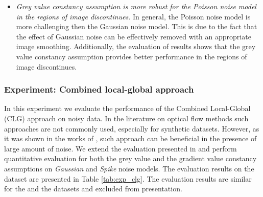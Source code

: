\begin{itemize}
	\item \textit{Grey value constancy assumption is more robust for the Poisson noise model in the regions of image discontinues}.  In general, the Poisson noise model is more challenging then the Gaussian noise model. This is due to the fact that the effect of Gaussian noise can be effectively removed with an appropriate image smoothing. Additionally, the evaluation of results shows that the grey value constancy assumption provides better performance in the regions of image discontinues.  
\end{itemize}





\subsubsection{Experiment: Combined local-global approach}
\label{experimen_combined_local_global_approach}


In this experiment we evaluate the performance of the Combined Local-Global (CLG) approach on noisy data. In the literature on optical flow methods such approaches are not commonly used, especially for synthetic datasets. However, as it was shown in the works of \cite{Bruhn02, Bruhn05a}, such approach can be beneficial in the presence of large amount of noise. We extend the evaluation presented in \cite{BruhnThesis} and perform quantitative evaluation for both the grey value and the gradient value constancy assumptions on \textit{Gaussian} and \textit{Spike} noise models. The evaluation results on the \rub dataset are presented in Table \ref{tab:exp_clg}. The evaluation results are similar for the \hyd and the \mar datasets and excluded from presentation. 





